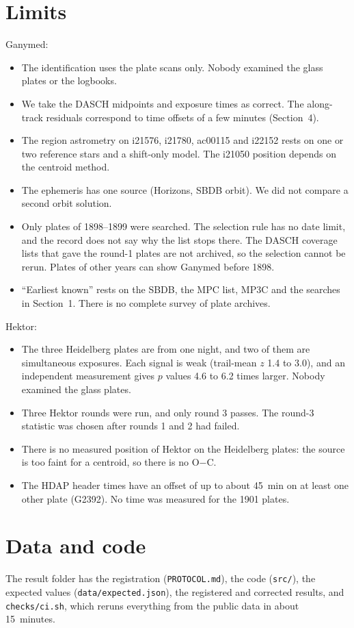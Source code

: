 \documentclass[11pt]{article}
\begin{document}
\section{Limits}
Ganymed:
\begin{itemize}
\item The identification uses the plate scans only. Nobody examined the glass plates or the logbooks.
\item We take the DASCH midpoints and exposure times as correct. The along-track residuals correspond to time offsets of a few minutes (Section~4).
\item The region astrometry on i21576, i21780, ac00115 and i22152 rests on one or two reference stars and a shift-only model. The i21050 position depends on the centroid method.
\item The ephemeris has one source (Horizons, SBDB orbit). We did not compare a second orbit solution.
\item Only plates of 1898--1899 were searched. The selection rule has no date limit, and the record does not say why the list stops there. The DASCH coverage lists that gave the round-1 plates are not archived, so the selection cannot be rerun. Plates of other years can show Ganymed before 1898.
\item ``Earliest known'' rests on the SBDB, the MPC list, MP3C and the searches in Section~1. There is no complete survey of plate archives.
\end{itemize}
Hektor:
\begin{itemize}
\item The three Heidelberg plates are from one night, and two of them are simultaneous exposures. Each signal is weak (trail-mean $z$ 1.4 to 3.0), and an independent measurement gives $p$ values 4.6 to 6.2 times larger. Nobody examined the glass plates.
\item Three Hektor rounds were run, and only round 3 passes. The round-3 statistic was chosen after rounds 1 and 2 had failed.
\item There is no measured position of Hektor on the Heidelberg plates: the source is too faint for a centroid, so there is no O$-$C.
\item The HDAP header times have an offset of up to about 45~min on at least one other plate (G2392). No time was measured for the 1901 plates.
\end{itemize}

\section*{Data and code}
The result folder has the registration (\texttt{PROTOCOL.md}), the code (\texttt{src/}), the expected values (\texttt{data/expected.json}), the registered and corrected results, and \texttt{checks/ci.sh}, which reruns everything from the public data in about 15~minutes.
\end{document}
